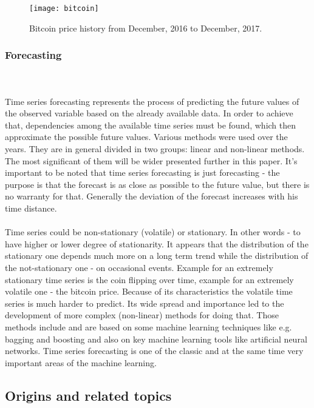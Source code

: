 \documentclass[runningheads,a4paper]{llncs}[2015/06/24]
\begin{document}
\begin{figure}[h]
\centering
\texttt{[image: bitcoin]}
\caption{Bitcoin price history from December,  2016 to December, 2017.}
\label{fig:bitcoin}
\end{figure}

		\subsubsection{Forecasting} \hspace{1cm}\\\\Time series forecasting represents the process of predicting the future values of the observed variable based on the already available data. In order to achieve that, dependencies among the available time series must be found, which then approximate the possible future values. Various methods were used over the years. They are in general divided  in two groups: linear and non-linear methods. The most significant of them will be wider presented  further in this paper. It's important to be noted that time series forecasting is just forecasting - the purpose is that the forecast is as close as possible to the future value, but there is no warranty for that. Generally the deviation of the forecast increases with his time distance.\\\\ Time series could be non-stationary (volatile) or stationary. In other words - to have higher or lower degree of stationarity. It appears that the distribution of the stationary one depends much more on a long term trend while the distribution of the not-stationary one - on occasional events. Example for an extremely stationary time series is the coin flipping over time, example for an extremely volatile one - the bitcoin price. Because of its characteristics the volatile time series is much harder to predict. Its wide spread and importance led to the development of more complex (non-linear) methods for doing that. Those methods include and are based on some machine learning techniques like e.g. bagging and boosting and also on key machine learning tools like artificial neural networks. Time series forecasting is one of the classic and at the same time very important areas of the machine learning.
	\subsection{Origins and related topics}
\end{document}
